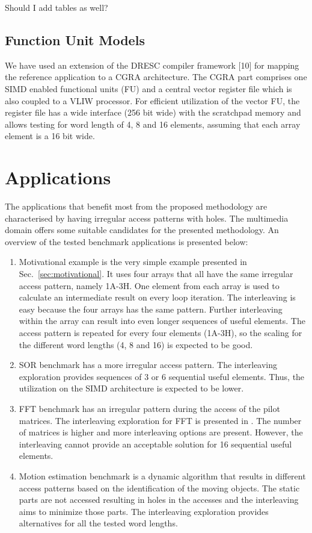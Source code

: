 \documentclass[prodmode,acmtodaes]{acmsmall}
\begin{document}
Should I add tables as well?

\subsection{Function Unit Models}

We have used an extension of the DRESC compiler framework [10] for mapping the reference application to a CGRA architecture.
The CGRA part comprises one SIMD enabled functional units (FU) and a central vector register file which is also coupled to a VLIW processor. 
For efficient utilization of the vector FU, the register file has a wide interface (256 bit wide) with the scratchpad memory and allows testing for word length of 4, 8 and 16 elements, assuming that each array element is a 16 bit wide.  

\section{Applications}
\label{sec:applications}

The applications that benefit most from the proposed methodology are characterised by having irregular access patterns with holes.
The multimedia domain offers some suitable candidates for the presented methodology.
An overview of the tested benchmark applications is presented below:

\begin{enumerate}
\item Motivational example is the very simple example presented in Sec.~\ref{sec:motivational}. 
It uses four arrays that all have the same irregular access pattern, namely 1A-3H.
One element from each array is used to calculate an intermediate result on every loop iteration.
The interleaving is easy because the four arrays has the same pattern.
Further interleaving within the array can result into even longer sequences of useful elements.
The access pattern is repeated for every four elements (1A-3H), so the scaling for the different word lengths (4, 8 and 16) is expected to be good. 
\item SOR benchmark has a more irregular access pattern.
The interleaving exploration provides sequences of 3 or 6 sequential useful elements.
Thus, the utilization on the SIMD architecture is expected to be lower.
\item FFT benchmark has an irregular pattern during the access of the pilot matrices. 
The interleaving exploration for FFT is presented in \cite{sharma2013data}.
The number of matrices is higher and more interleaving options are present.
However, the interleaving cannot provide an acceptable solution for 16 sequential useful elements.
\item Motion estimation benchmark is a dynamic algorithm that results in different access patterns based on the identification of the moving objects. 
The static parts are not accessed resulting in holes in the accesses and the interleaving aims to minimize those parts.
The interleaving exploration provides alternatives for all the  tested word lengths. 
\end{enumerate}
\end{document}
